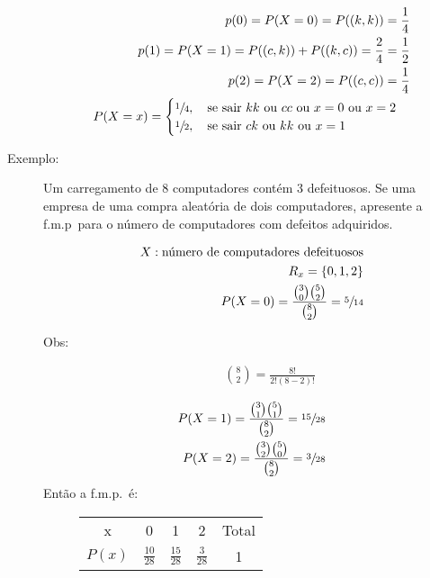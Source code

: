\begin{description}
       \begin{align*}
         p(0)=P(X=0)=P((k,k))=\frac{1}{4} \\
         p(1)=P(X=1)=P((c,k))+P((k,c))=\frac{2}{4}=\frac{1}{2}\\
         p(2)=P(X=2)=P((c,c))=\frac{1}{4}\\
         P(X=x)= \begin{cases}
           \sfrac{1}{4}, \text{\quad se sair $kk$ ou $cc$ ou $x=0$ ou $x=2$}\\
           \sfrac{1}{2}, \text{\quad se sair $ck$ ou $kk$ ou $x=1$ }
         \end{cases}
       \end{align*}

     \item [Exemplo:] Um carregamento de 8 computadores contém 3 defeituosos. Se uma empresa de uma compra aleatória de dois computadores, apresente a f.m.p\ para o número de computadores com defeitos adquiridos.

       \begin{align*}   X: \text{número de computadores defeituosos}\\
         R_x = \{0,1,2\} \\
         P(X=0) = \frac{ \tbinom{3}{0} \tbinom{5}{2} }{ \binom{8}{2} }= \sfrac{5}{14}
       \end{align*}
       \begin{description}
         \item [Obs:]
           \begin{align*}
             \binom{8}{2} = \frac{8!}{2!\left( 8-2 \right)!}
           \end{align*} 
       \end{description}

       \begin{align*}
         P(X=1) = \frac{ \binom{3}{1} \binom{5}{1} }{ \binom{8}{2}}= \sfrac{15}{28} \\
         P(X=2) = \frac{ \binom{3}{2} \binom{5}{0} }{ \binom{8}{2}}=\sfrac{ 3}{28} 
       \end{align*}
       Então a f.m.p.\ é:
       \begin{figure}[H]
         \centering
         \begin{tabular}{ c c c c c}
           \toprule
           x &0&1&2&Total \\ \cmidrule{2-4}
           $P(x)$&$\frac{10}{28}$&$\frac{15}{28}$&$ \frac{3}{28}$&1\\    \bottomrule
         \end{tabular}
       \end{figure}


\end{description}
